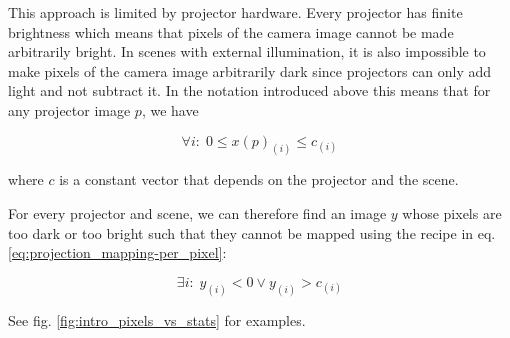 This approach is limited by projector hardware. Every projector has finite brightness which means that pixels of the camera image cannot be made arbitrarily bright. In scenes with external illumination, it is also impossible to make pixels of the camera image arbitrarily dark since projectors can only add light and not subtract it. In the notation introduced above this means that for any projector image \(p\), we have

\begin{equation}
    \label{eq:projection_mapping-limitations}
    \forall i:\; 0 \leq x(p)_{(i)} \leq c_{(i)}
\end{equation}

where \(c\) is a constant vector that depends on the projector and the scene.

For every projector and scene, we can therefore find an image \(y\) whose pixels are too dark or too bright such that they cannot be mapped using the recipe in eq. \ref{eq:projection_mapping-per_pixel}:

\begin{equation}
    \label{eq:projection_mapping-hard_image}
    \exists i:\; y_{(i)} < 0 \lor y_{(i)} > c_{(i)}
\end{equation}

See fig. \ref{fig:intro_pixels_vs_stats} for examples.

